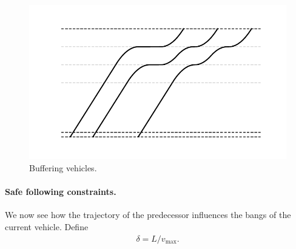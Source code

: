 \documentclass[a4paper]{article}
\theoremstyle{definition}
\theoremstyle{plain}
\begin{document}
\begin{figure}
  \centering
  \includegraphics{figures/motion/buffer}
  \caption{Buffering vehicles.}
\end{figure}


\paragraph{Safe following constraints.}
We now see how the trajectory of the predecessor influences the bangs of the current vehicle.
Define
\begin{align*}
  \delta = L / v_{\max} .
\end{align*}
\end{document}
